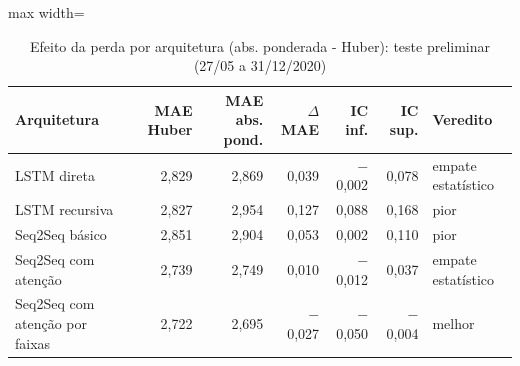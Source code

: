 \begin{table}[!htbp]
    \centering
    \caption{Efeito da perda por arquitetura (abs. ponderada - Huber): teste preliminar (27/05 a 31/12/2020)}
    \label{tab:fatorial_perda_teste_historico}
    \small
    \begin{adjustbox}{max width=\textwidth}
    \begin{tabular}{lrrrrrl}
        \toprule
        Arquitetura & MAE Huber & MAE abs. pond. & $\Delta$ MAE & IC inf. & IC sup. & Veredito \\
        \midrule
        LSTM direta & 2,829 & 2,869 & 0,039 & $-$0,002 & 0,078 & empate estatístico \\
        LSTM recursiva & 2,827 & 2,954 & 0,127 & 0,088 & 0,168 & pior \\
        Seq2Seq básico & 2,851 & 2,904 & 0,053 & 0,002 & 0,110 & pior \\
        Seq2Seq com atenção & 2,739 & 2,749 & 0,010 & $-$0,012 & 0,037 & empate estatístico \\
        Seq2Seq com atenção por faixas & 2,722 & 2,695 & $-$0,027 & $-$0,050 & $-$0,004 & melhor \\
        \bottomrule
    \end{tabular}
    \end{adjustbox}
\end{table}
